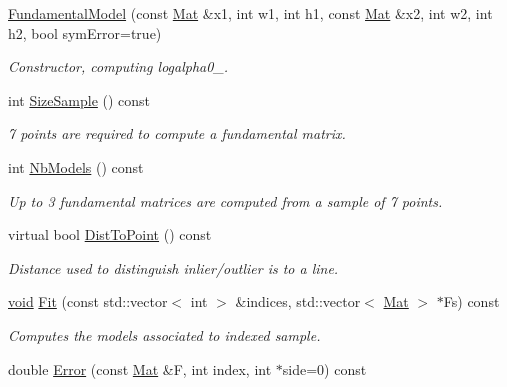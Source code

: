 \begin{DoxyCompactItemize}
\item 
\hyperlink{classorsa_1_1FundamentalModel_a0286d95782638672c8b69e961dbe440e}{Fundamental\+Model} (const \hyperlink{classorsa_1_1OrsaModel_a522135c09871e55e3757780cc1ce57f5}{Mat} \&x1, int w1, int h1, const \hyperlink{classorsa_1_1OrsaModel_a522135c09871e55e3757780cc1ce57f5}{Mat} \&x2, int w2, int h2, bool sym\+Error=true)
\begin{DoxyCompactList}\small\item\em Constructor, computing logalpha0\+\_\+. \end{DoxyCompactList}\item 
int \hyperlink{classorsa_1_1FundamentalModel_ac3870d76a0670fa5e07c1d72e39120ab}{Size\+Sample} () const 
\begin{DoxyCompactList}\small\item\em 7 points are required to compute a fundamental matrix. \end{DoxyCompactList}\item 
int \hyperlink{classorsa_1_1FundamentalModel_a16c8e7f3d6ce21236a2156e8daa4aedb}{Nb\+Models} () const 
\begin{DoxyCompactList}\small\item\em Up to 3 fundamental matrices are computed from a sample of 7 points. \end{DoxyCompactList}\item 
virtual bool \hyperlink{classorsa_1_1FundamentalModel_ab1a29cf875eb1a5b37d55a7264aeee25}{Dist\+To\+Point} () const 
\begin{DoxyCompactList}\small\item\em Distance used to distinguish inlier/outlier is to a line. \end{DoxyCompactList}\item 
\hyperlink{png_8h_aa8c59027f9ab2769342f248709d68d17}{void} \hyperlink{classorsa_1_1FundamentalModel_a283d79e9cf1f43f334ca04b586329752}{Fit} (const std\+::vector$<$ int $>$ \&indices, std\+::vector$<$ \hyperlink{classorsa_1_1OrsaModel_a522135c09871e55e3757780cc1ce57f5}{Mat} $>$ $\ast$Fs) const 
\begin{DoxyCompactList}\small\item\em Computes the models associated to indexed sample. \end{DoxyCompactList}\item 
double \hyperlink{classorsa_1_1FundamentalModel_a8cf06b60d6120bc9ee543376ce5dc0d6}{Error} (const \hyperlink{classorsa_1_1OrsaModel_a522135c09871e55e3757780cc1ce57f5}{Mat} \&F, int index, int $\ast$side=0) const 

\end{DoxyCompactItemize}
